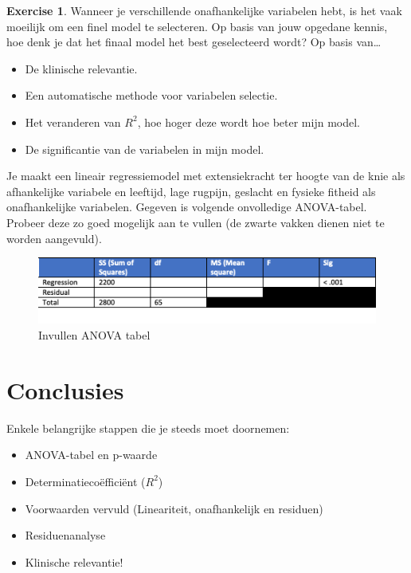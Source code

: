 \documentclass[
]{book}
\providecommand{\tightlist}{%
  \setlength{\itemsep}{0pt}\setlength{\parskip}{0pt}}
\theoremstyle{definition}
\theoremstyle{definition}
\theoremstyle{definition}
\newtheorem{exercise}{Exercise}[chapter]
\theoremstyle{definition}
\theoremstyle{remark}
\begin{document}
\begin{exercise}

Wanneer je verschillende onafhankelijke variabelen hebt, is het vaak moeilijk om een finel model te selecteren. Op basis van jouw opgedane kennis, hoe denk je dat het finaal model het best geselecteerd wordt? Op basis van\ldots{}

\begin{itemize}
\tightlist
\item
  De klinische relevantie.
\item
  Een automatische methode voor variabelen selectie.
\item
  Het veranderen van \(R^2\), hoe hoger deze wordt hoe beter mijn model.
\item
  De significantie van de variabelen in mijn model.
\end{itemize}

\end{exercise}

Je maakt een lineair regressiemodel met extensiekracht ter hoogte van de knie als afhankelijke variabele en leeftijd, lage rugpijn, geslacht en fysieke fitheid als onafhankelijke variabelen. Gegeven is volgende onvolledige ANOVA-tabel. Probeer deze zo goed mogelijk aan te vullen (de zwarte vakken dienen niet te worden aangevuld).

\begin{figure}
\includegraphics[width=1\linewidth]{img/ex_tab_lm} \caption{Invullen ANOVA tabel}\label{fig:extablm}
\end{figure}

\hypertarget{conclusies-1}{%
\section*{Conclusies}\label{conclusies-1}}


Enkele belangrijke stappen die je steeds moet doornemen:

\begin{itemize}
\tightlist
\item
  ANOVA-tabel en p-waarde
\item
  Determinatiecoëfficiënt (\(R^2\))
\item
  Voorwaarden vervuld (Lineariteit, onafhankelijk en residuen)
\item
  Residuenanalyse
\item
  Klinische relevantie!
\end{itemize}
\end{document}
